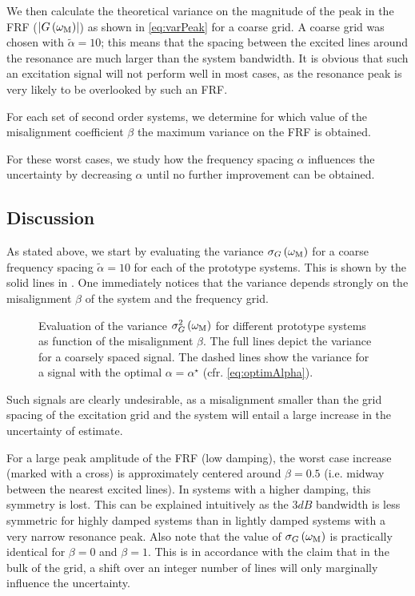   We then calculate the theoretical variance on the magnitude of the peak in the FRF ($\left| G\left( \omega_{\mathrm{M}} \right) \right|$) as shown in \eqref{eq:varPeak} for a coarse grid.
  A coarse grid was chosen with $\tilde{\alpha} = 10$; this means that the spacing between the excited lines around the resonance are much larger than the system bandwidth.
  It is obvious that such an excitation signal will not perform well in most cases, as the resonance peak is very likely to be overlooked by such an FRF.
  
  For each set of second order systems, we determine for which value of the misalignment coefficient $\beta$ the maximum variance on the FRF is obtained.
  
  For these worst cases, we study how the frequency spacing $\alpha$ influences the uncertainty by decreasing $\alpha$ until no further improvement can be obtained.

  \subsection{Discussion} \label{sec:bestFrequencyResolution}
  As stated above, we start by evaluating the variance $\sigma_G\left( \omega_{\mathrm{M}}\right)$ for a coarse frequency spacing $\tilde{\alpha} = 10$ for each of the prototype systems.
  This is shown by the solid lines in .
  One immediately notices that the variance depends strongly on the misalignment $\beta$ of the system and the frequency grid.
  
  \begin{figure}
    \centering
      \setlength\figureheight{5cm}
      \setlength{}
    
    \caption[Variance $\sigma_G^2\left( \wM \right)$ as a function of the grid misalignment coefficient $\beta$.]{Evaluation of the variance $\sigma_G^2\left( \wM \right) $ for different prototype systems as function of the misalignment $\beta$.
             The full lines depict the variance for a coarsely spaced signal.
             The dashed lines show the variance for a signal with the optimal $\alpha = \alpha^{\star}$ (cfr. \eqref{eq:optimAlpha}).}
    \label{fig:worstCaseBeta}
  \end{figure}

  Such signals are clearly undesirable, as a misalignment smaller than the grid spacing of the excitation grid and the system will entail a large increase in the uncertainty of estimate.
  
  For a large peak amplitude of the FRF (low damping), the worst case increase (marked with a cross) is approximately centered around $\beta = 0.5$ (i.e. midway between the nearest excited lines).
  In systems with a higher damping, this symmetry is lost.
  This can be explained intuitively as the $3\unit{dB}$ bandwidth is less symmetric for highly damped systems than in lightly damped systems with a very narrow resonance peak.
  Also note that the value of $\sigma_G\left(\omega_{\mathrm{M}} \right)$ is practically identical for $\beta=0$ and $\beta=1$.
  This is in accordance with the claim that in the bulk of the grid, a shift over an integer number of lines will only marginally influence the uncertainty.
  
